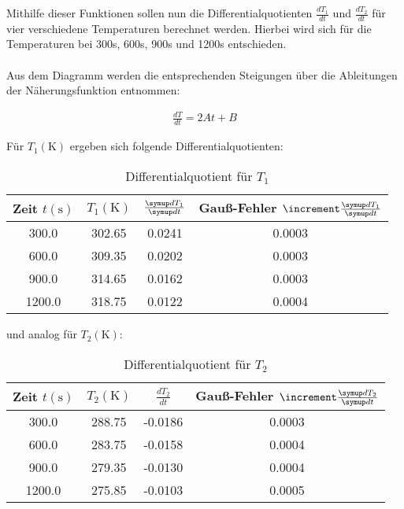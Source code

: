 Mithilfe dieser Funktionen sollen nun die Differentialquotienten $\frac{dT_{1}}{dt}$ und $\frac{dT_{2}}{dt}$ 
für vier verschiedene Temperaturen berechnet werden. Hierbei wird sich für die Temperaturen bei 
300s, 600s, 900s und 1200s entschieden. 
\\\\
Aus dem Diagramm werden die entsprechenden Steigungen über die Ableitungen der Näherungsfunktion entnommen:

\begin{align*} 
  \frac{dT}{dt} = 2At + B 
\end{align*}

Für $T_{1} (\unit{\kelvin})$ ergeben sich folgende Differentialquotienten:

\begin{table}
  \centering
  \caption{Differentialquotient für $T_{1}$}
  \label{tab:berechnete_werte_T1}
  \begin{tabular}{c c c c}
    \toprule
    {Zeit $t (\unit{\second})$} &
    {$T_{1} (\unit{\kelvin})$} &
    {$\frac{\dif{T_{1}}} {\dif{t}}$} & 
    {Gauß-Fehler $\increment \frac{\dif{T_{1}}} {\dif{t}}$}\\
    \midrule
     300.0 & 302.65 &  0.0241 &   0.0003 \\
     600.0 & 309.35 &  0.0202 &   0.0003 \\
     900.0 & 314.65 &  0.0162 &   0.0003 \\
    1200.0 & 318.75 &  0.0122 &   0.0004 \\
    \bottomrule
  \end{tabular}
\end{table}

und analog für $T_{2} (\unit{\kelvin})$:

\begin{table}
  \centering
  \caption{Differentialquotient für $T_{2}$}
  \label{tab:berechnete_werte_T2}
  \begin{tabular}{c c c c}
    \toprule
    {Zeit $t (\unit{\second})$} &
    {$T_{2} (\unit{\kelvin})$} &
    {$\frac{dT_{2}}{dt}$} &
    {Gauß-Fehler $\increment \frac{\dif{T_{2}}} {\dif{t}}$} \\
    \midrule
     300.0 & 288.75 & -0.0186 &   0.0003 \\
     600.0 & 283.75 & -0.0158 &   0.0004 \\
     900.0 & 279.35 & -0.0130 &   0.0004 \\
    1200.0 & 275.85 & -0.0103 &   0.0005 \\
    \bottomrule
  \end{tabular}
\end{table}

